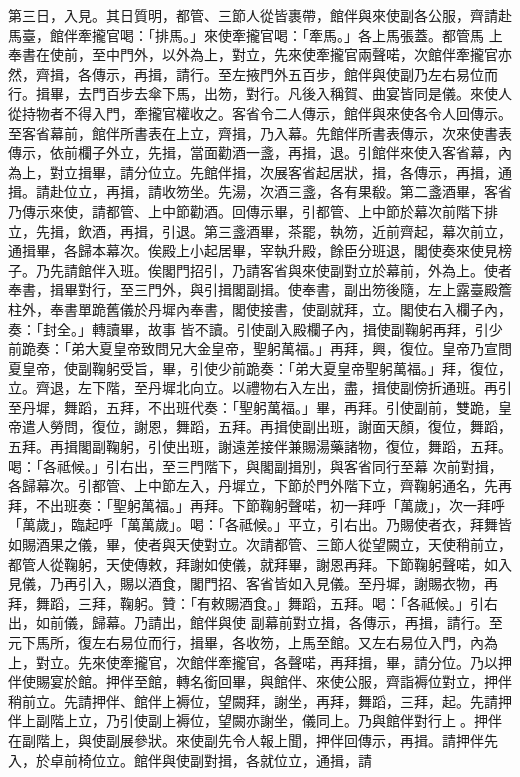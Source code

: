 \begin{pinyinscope}
 第三日，入見。其日質明，都管、三節人從皆裹帶，館伴與來使副各公服，齊請赴馬臺，館伴牽攏官喝：「排馬。」來使牽攏官喝：「牽馬。」各上馬張蓋。都管馬
 上奉書在使前，至中門外，以外為上，對立，先來使牽攏官兩聲喏，次館伴牽攏官亦然，齊揖，各傳示，再揖，請行。至左掖門外五百步，館伴與使副乃左右易位而行。揖畢，去門百步去傘下馬，出笏，對行。凡後入稱賀、曲宴皆同是儀。來使人從持物者不得入門，牽攏官權收之。客省令二人傳示，館伴與來使各令人回傳示。至客省幕前，館伴所書表在上立，齊揖，乃入幕。先館伴所書表傳示，次來使書表傳示，依前欄子外立，先揖，當面勸酒一盞，再揖，退。引館伴來使入客省幕，內為上，對立揖畢，請分位立。先館伴揖，次展客省起居狀，揖，各傳示，再揖，通
 揖。請赴位立，再揖，請收笏坐。先湯，次酒三盞，各有果殽。第二盞酒畢，客省乃傳示來使，請都管、上中節勸酒。回傳示畢，引都管、上中節於幕次前階下排立，先揖，飲酒，再揖，引退。第三盞酒畢，茶罷，執笏，近前齊起，幕次前立，通揖畢，各歸本幕次。俟殿上小起居畢，宰執升殿，餘臣分班退，閣使奏來使見榜子。乃先請館伴入班。俟閣門招引，乃請客省與來使副對立於幕前，外為上。使者奉書，揖畢對行，至三門外，與引揖閣副揖。使奉書，副出笏後隨，左上露臺殿簷柱外，奉書單跪舊儀於丹墀內奉書，閣使接書，使副就拜，立。閣使右入欄子內，奏：「封全。」轉讀畢，故事
 皆不讀。引使副入殿欄子內，揖使副鞠躬再拜，引少前跪奏：「弟大夏皇帝致問兄大金皇帝，聖躬萬福。」再拜，興，復位。皇帝乃宣問夏皇帝，使副鞠躬受旨，畢，引使少前跪奏：「弟大夏皇帝聖躬萬福。」拜，復位，立。齊退，左下階，至丹墀北向立。以禮物右入左出，盡，揖使副傍折通班。再引至丹墀，舞蹈，五拜，不出班代奏：「聖躬萬福。」畢，再拜。引使副前，雙跪，皇帝遣人勞問，復位，謝恩，舞蹈，五拜。再揖使副出班，謝面天顏，復位，舞蹈，五拜。再揖閣副鞠躬，引使出班，謝遠差接伴兼賜湯藥諸物，復位，舞蹈，五拜。喝：「各祗候。」引右出，至三門階下，與閣副揖別，與客省同行至幕
 次前對揖，各歸幕次。引都管、上中節左入，丹墀立，下節於門外階下立，齊鞠躬通名，先再拜，不出班奏：「聖躬萬福。」再拜。下節鞠躬聲喏，初一拜呼「萬歲」，次一拜呼「萬歲」，臨起呼「萬萬歲」。喝：「各祗候。」平立，引右出。乃賜使者衣，拜舞皆如賜酒果之儀，畢，使者與天使對立。次請都管、三節人從望闕立，天使稍前立，都管人從鞠躬，天使傳敕，拜謝如使儀，就拜畢，謝恩再拜。下節鞠躬聲喏，如入見儀，乃再引入，賜以酒食，閣門招、客省皆如入見儀。至丹墀，謝賜衣物，再拜，舞蹈，三拜，鞠躬。贊：「有敕賜酒食。」舞蹈，五拜。喝：「各祗候。」引右出，如前儀，歸幕。乃請出，館伴與使
 副幕前對立揖，各傳示，再揖，請行。至元下馬所，復左右易位而行，揖畢，各收笏，上馬至館。又左右易位入門，內為上，對立。先來使牽攏官，次館伴牽攏官，各聲喏，再拜揖，畢，請分位。乃以押伴使賜宴於館。押伴至館，轉名銜回畢，與館伴、來使公服，齊詣褥位對立，押伴稍前立。先請押伴、館伴上褥位，望闕拜，謝坐，再拜，舞蹈，三拜，起。先請押伴上副階上立，乃引使副上褥位，望闕亦謝坐，儀同上。乃與館伴對行上。押伴在副階上，與使副展參狀。來使副先令人報上聞，押伴回傳示，再揖。請押伴先入，於卓前椅位立。館伴與使副對揖，各就位立，通揖，請

\end{pinyinscope}
